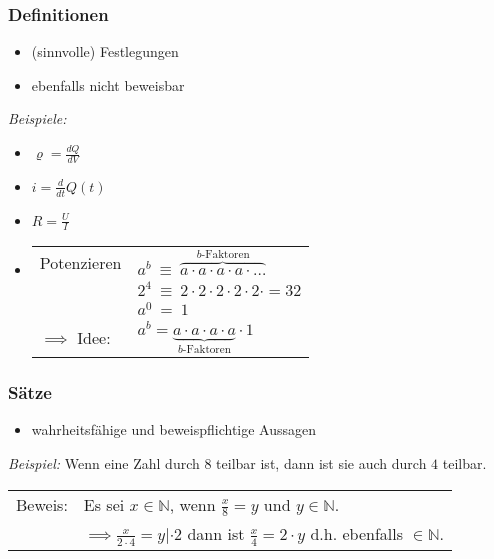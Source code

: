         \subsubsection{Definitionen}
            \begin{itemize}[leftmargin=*]
                \item (sinnvolle) Festlegungen
                \item ebenfalls nicht beweisbar
            \end{itemize}
            \textit{Beispiele:}
            \begin{itemize}[leftmargin=*]
                \item $\varrho = \frac{dQ}{dV}$
                \item $i = \frac{d}{dt} Q(t)$
                \item $R = \frac{U}{I}$
                \item   \begin{tabular}[t]{@{}l l}
                        Potenzieren     &  $a^b  \ \equiv \ \overbrace{a \cdot a \cdot a \cdot a \cdot \ldots}^{b \text{-Faktoren}} $ \\
                                        &  $2^{4}\ \equiv \ {2 \cdot 2 \cdot 2 \cdot 2 \cdot 2 \cdot = 32}$ \\ 
                                        &  $a^0 \ = \ 1$ \\
                        $\implies$ Idee: &  $a^b = \underbrace{a \cdot a \cdot a \cdot a}_{b \text{-Faktoren}} \cdot 1$ \\  
                        \end{tabular}
            \end{itemize}
        \subsubsection{Sätze}
            \begin{itemize}[leftmargin=*]
                \item wahrheitsfähige und beweispflichtige Aussagen
            \end{itemize}
            \textit{Beispiel: } Wenn eine Zahl durch $8$ teilbar ist, dann ist sie auch durch $4$ teilbar. 

            \begin{tabular}{@{}l l}
                Beweis: & Es sei $x\in\mathbb{N}$, wenn $\frac{x}{8} = y$ und $y\in\mathbb{N}$. \\
                & $\implies \frac{x}{2 \cdot 4} = y | \cdot 2$ dann ist $\frac{x}{4} = 2 \cdot y$ d.h. ebenfalls $\in\mathbb{N}$. \\
            \end{tabular}

